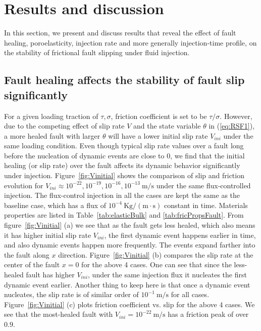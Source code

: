 \section{Results and discussion}
\label{sec:resultsAndDiscussion}
In this section, 
we present and discuss results that reveal the effect of fault healing, 
poroelasticity, 
injection rate and more generally injection-time profile, 
on the stability of frictional fault slipping under fluid injection. 

\subsection{Fault healing affects the stability of fault slip significantly}
For a given loading traction of $\tau, \sigma$, 
friction coefficient is set to be $\tau / \sigma$. 
However, 
due to the competing effect of slip rate $V$ and the state variable $\theta$ in (\ref{eq:RSF1}), 
a more healed fault with larger $\theta$ will have a lower initial slip rate $V_{ini}$ under the same loading condition. 
Even though typical slip rate values over a fault long before the nucleation of dynamic events are close to $0$, 
we find that the initial healing (or slip rate) over the fault affects its dynamic behavior significantly under injection. 
Figure~\ref{fig:Vinitial} shows the comparison of slip and friction evolution for $V_{ini}\approx10^{-22}, 10^{-19}, 10^{-16}, 10^{-13}\ \mathrm{m/s}$ under the same flux-controlled injection. 
The flux-control injection in all the cases are kept the same as the baseline case, 
which has a flux of $10^{-4}\ \mathrm{Kg/(m\cdot s)}$ constant in time. 
Materials properties are listed in Table~\ref{tab:elasticBulk} and \ref{tab:fricPropsFault}. 
From figure~\ref{fig:Vinitial} (a) we see that as the fault gets less healed, 
which also means it has higher initial slip rate $V_{ini}$, 
the first dynamic event happens earlier in time, 
and also dynamic events happen more frequently. 
The events expand farther into the fault along $x$ direction. 
Figure~\ref{fig:Vinitial} (b) compares the slip rate at the center of the fault $x = 0$ for the above 4 cases. 
One can see that since the less-healed fault has higher $V_{ini}$, 
under the same injection flux it nucleates the first dynamic event earlier. 
Another thing to keep here is that once a dynamic event nucleates, 
the slip rate is of similar order of $10^{-1}\ \mathrm{m/s}$ for all cases. 
Figure~\ref{fig:Vinitial} (c) plots friction coefficient vs. slip for the above 4 cases. 
We see that the most-healed fault with $V_{ini}=10^{-22}\ \mathrm{m/s}$ has a friction peak of over $0.9$. 
